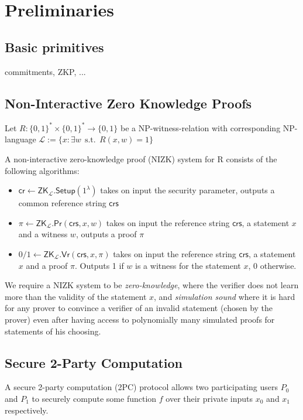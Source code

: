 
\section{Preliminaries}

\subsection{Basic primitives}

\begin{todobox}
    commitments, ZKP, ...
\end{todobox}
\subsection{Non-Interactive Zero Knowledge Proofs}

Let $R: \{0, 1\}^* \times \{0, 1\}^* \rightarrow \{0, 1\}$ be a NP-witness-relation with corresponding NP-language $\mathcal{L} := \{x : \exists w \:\: \text{s.t.} \:\: R(x, w) = 1\}$

A non-interactive zero-knowledge proof (NIZK) system for R consists of the following algorithms:
\begin{itemize}
    \item $\mathsf{cr} \gets \mathsf{ZK}_\mathcal{L}.\mathsf{Setup}(1^\lambda)$ takes on input the security parameter, outputs a common reference string $\mathsf{crs}$
    \item $\pi \gets \mathsf{ZK}_\mathcal{L}.\mathsf{Pr}(\mathsf{crs}, x, w)$ takes on input the reference string $\mathsf{crs}$, a statement $x$ and a witness $w$, outputs a proof $\pi$
    \item $0/1 \gets \mathsf{ZK}_\mathcal{L}.\mathsf{Vr}(\mathsf{crs}, x,\pi)$ takes on input the reference string $\mathsf{crs}$, a statement $x$ and a proof $\pi$. Outputs 1 if $w$ is a witness for the statement $x$, 0 otherwise.
\end{itemize}
We require a NIZK system to be \textit{zero-knowledge}, where the verifier does not learn more than the validity of the statement $x$, and \textit{simulation sound} where it is hard for any prover
to convince a verifier of an invalid statement (chosen by the prover) even after having access to polynomially many simulated proofs for statements of his choosing.

\subsection{Secure 2-Party Computation}
A secure 2-party computation (2PC) protocol allows two participating users $P_0$ and $P_1$ to securely compute some function $f$ over their private inputs $x_0$ and $x_1$ respectively.

